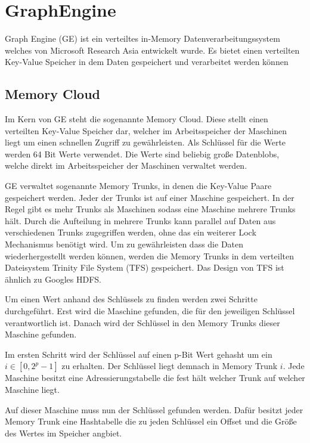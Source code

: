 \section{GraphEngine}

Graph Engine (GE) ist ein verteiltes in-Memory Datenverarbeitungssystem welches von Microsoft Research Asia 
entwickelt wurde. Es bietet einen verteilten Key-Value Speicher in dem Daten gespeichert und verarbeitet werden können

\subsection{Memory Cloud}

Im Kern von GE steht die sogenannte Memory Cloud. Diese stellt einen verteilten Key-Value Speicher dar, welcher im Arbeitsspeicher der Maschinen
liegt um einen schnellen Zugriff zu gewährleisten.
Als Schlüssel für die Werte werden 64 Bit Werte verwendet.
Die Werte sind beliebig große Datenblobs, welche direkt im Arbeitsspeicher der Maschinen verwaltet werden.

GE verwaltet sogenannte Memory Trunks, in denen die Key-Value Paare gespeichert werden. Jeder der Trunks ist auf einer Maschine gespeichert.
In der Regel gibt es mehr Trunks als Maschinen sodass eine Maschine mehrere Trunks hält. Durch die Aufteilung in mehrere Trunks kann parallel auf Daten aus verschiedenen Trunks zugegriffen
werden, ohne das ein weiterer Lock Mechanismus benötigt wird.
Um zu gewährleisten dass die Daten wiederhergestellt werden können, werden die Memory Trunks in dem verteilten Dateisystem Trinity File System (TFS) gespeichert. Das Design von TFS ist ähnlich zu Googles HDFS.



Um einen Wert anhand des Schlüssels zu finden werden zwei Schritte durchgeführt. Erst wird die Maschine gefunden, die für den jeweiligen Schlüssel
verantwortlich ist. Danach wird der Schlüssel in den Memory Trunks dieser Maschine gefunden.

Im ersten Schritt wird der Schlüssel auf einen p-Bit Wert gehasht um ein  $ i \in [0, 2^{p} - 1] $ zu erhalten. Der Schlüssel liegt demnach in
Memory Trunk $ i $. Jede Maschine besitzt eine Adressierungstabelle die fest hält welcher Trunk auf welcher Maschine liegt.

Auf dieser Maschine muss nun der Schlüssel gefunden werden. Dafür besitzt jeder Memory Trunk eine Hashtabelle die zu jeden Schlüssel
ein Offset und die Größe des Wertes im Speicher angbiet.

